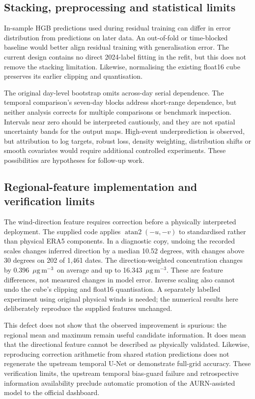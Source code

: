 \documentclass[11pt,a4paper]{article}
\newcommand{\ug}{\ensuremath{\mu\mathrm{g}\,\mathrm{m}^{-3}}}
\begin{document}
\subsection{Stacking, preprocessing and statistical limits}
In-sample HGB predictions used during residual training can differ in error
distribution from predictions on later data. An out-of-fold or time-blocked
baseline would better align residual training with generalisation error.
The current design contains no direct 2024-label fitting in the refit, but
this does not remove the stacking limitation. Likewise, normalising the
existing float16 cube preserves its earlier clipping and quantisation.

The original day-level bootstrap omits across-day serial dependence. The
temporal comparison's seven-day blocks address short-range dependence, but
neither analysis corrects for multiple comparisons or benchmark inspection.
Intervals near zero should be interpreted cautiously, and they are not
spatial uncertainty bands for the output maps. High-event underprediction is
observed, but attribution to log targets, robust loss, density weighting,
distribution shifts or smooth covariates would require additional controlled
experiments. These possibilities are hypotheses for follow-up work.

\subsection{Regional-feature implementation and verification limits}
\label{sec:aurn-limits}
The wind-direction feature requires correction before a physically interpreted
deployment. The supplied code applies $\operatorname{atan2}(-u,-v)$ to
standardised rather than physical ERA5 components. In a diagnostic copy,
undoing the recorded scales changes inferred direction by a median
10.52 degrees, with changes above 30 degrees on 202 of 1,461 dates. The
direction-weighted concentration changes by 0.396~\ug\ on average and
up to 16.343~\ug. These are feature differences, not measured changes in
model error. Inverse scaling also cannot undo the cube's clipping and float16
quantisation. A separately labelled experiment using original physical winds
is needed; the numerical results here deliberately reproduce the supplied
features unchanged.

This defect does not show that the observed improvement is spurious: the
regional mean and maximum remain useful candidate information. It does mean
that the directional feature cannot be described as physically validated.
Likewise, reproducing correction arithmetic from shared station predictions
does not regenerate the upstream temporal U-Net or demonstrate full-grid
accuracy. These verification limits, the upstream temporal bias-guard failure
and retrospective information availability preclude automatic promotion of
the AURN-assisted model to the official dashboard.
\end{document}

